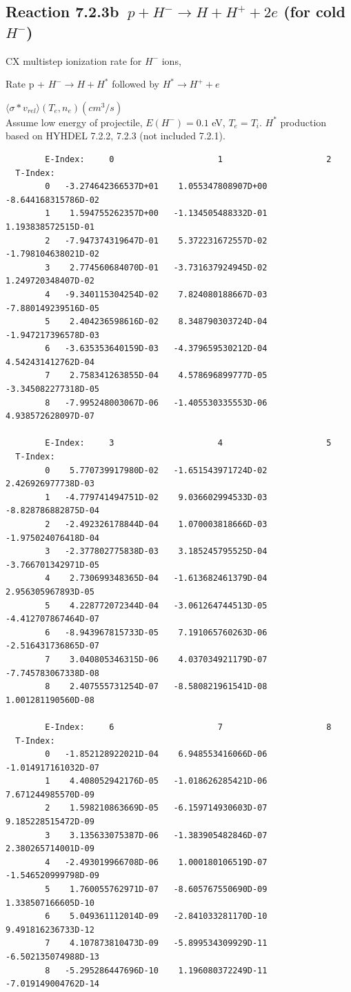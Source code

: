 \documentclass[12pt,dvips]{article}
\begin{document}
\subsection{
Reaction 7.2.3b   $\  p + H^{-} \rightarrow  H + H^+ + 2e$ (for cold $H^-$)
}

  CX multistep ionization rate for $H^-$ ions,
 \cite{kn:Sawada}

  Rate p + $H^- \rightarrow H + H^*$ followed by $H^* \rightarrow H^+
+e$

$  \langle \sigma*v_{rel} \rangle(T_e,n_e) (cm^3/s)$ \\
Assume low energy of projectile, $E(H^-)=0.1$ eV, $T_e = T_i$.
$H^*$ production based on HYHDEL 7.2.2, 7.2.3 (not included 7.2.1).

\begin{small}\begin{verbatim}
        E-Index:     0                     1                     2
  T-Index:
        0   -3.274642366537D+01    1.055347808907D+00   -8.644168315786D-02
        1    1.594755262357D+00   -1.134505488332D-01    1.193838572515D-01
        2   -7.947374319647D-01    5.372231672557D-02   -1.798104638021D-02
        3    2.774560684070D-01   -3.731637924945D-02    1.249720348407D-02
        4   -9.340115304254D-02    7.824080188667D-03   -7.880149239516D-05
        5    2.404236598616D-02    8.348790303724D-04   -1.947217396578D-03
        6   -3.635353640159D-03   -4.379659530212D-04    4.542431412762D-04
        7    2.758341263855D-04    4.578696899777D-05   -3.345082277318D-05
        8   -7.995248003067D-06   -1.405530335553D-06    4.938572628097D-07

        E-Index:     3                     4                     5
  T-Index:
        0    5.770739917980D-02   -1.651543971724D-02    2.426926977738D-03
        1   -4.779741494751D-02    9.036602994533D-03   -8.828786882875D-04
        2   -2.492326178844D-04    1.070003818666D-03   -1.975024076418D-04
        3   -2.377802775838D-03    3.185245795525D-04   -3.766701342971D-05
        4    2.730699348365D-04   -1.613682461379D-04    2.956305967893D-05
        5    4.228772072344D-04   -3.061264744513D-05   -4.412707867464D-07
        6   -8.943967815733D-05    7.191065760263D-06   -2.516431736865D-07
        7    3.040805346315D-06    4.037034921179D-07   -7.745783067338D-08
        8    2.407555731254D-07   -8.580821961541D-08    1.001281190560D-08

        E-Index:     6                     7                     8
  T-Index:
        0   -1.852128922021D-04    6.948553416066D-06   -1.014917161032D-07
        1    4.408052942176D-05   -1.018626285421D-06    7.671244985570D-09
        2    1.598210863669D-05   -6.159714930603D-07    9.185228515472D-09
        3    3.135633075387D-06   -1.383905482846D-07    2.380265714001D-09
        4   -2.493019966708D-06    1.000180106519D-07   -1.546520999798D-09
        5    1.760055762971D-07   -8.605767550690D-09    1.338507166605D-10
        6    5.049361112014D-09   -2.841033281170D-10    9.491816236733D-12
        7    4.107873810473D-09   -5.899534309929D-11   -6.502135074988D-13
        8   -5.295286447696D-10    1.196080372249D-11   -7.019149004762D-14


\end{verbatim}
\end{small}
\end{document}
